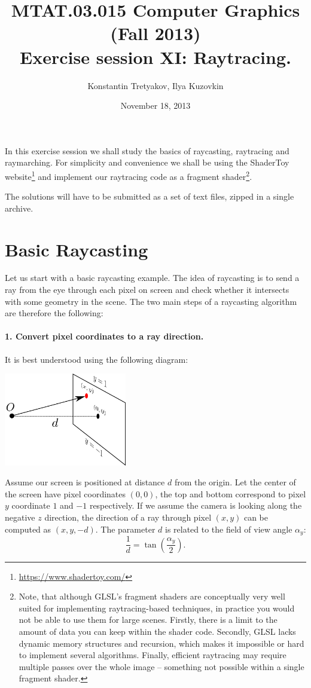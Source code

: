 \documentclass{article}
\begin{document}
\title{MTAT.03.015 Computer Graphics (Fall 2013)\\
Exercise session XI: Raytracing.}
\author{Konstantin Tretyakov, Ilya Kuzovkin}
\date{November 18, 2013}
\maketitle

In this exercise session we shall study the basics of raycasting, raytracing and raymarching. For simplicity and convenience we shall be using the ShaderToy website\footnote{\url{https://www.shadertoy.com/}} and implement our raytracing code as a fragment shader\footnote{Note, that although GLSL's fragment shaders are conceptually very well suited for implementing raytracing-based techniques, in practice you would not be able to use them for large scenes. Firstly, there is a limit to the amount of data you can keep within the shader code. Secondly, GLSL lacks dynamic memory structures and recursion, which makes it impossible or hard to implement several algorithms. Finally, efficient raytracing may require multiple passes over the whole image -- something not possible within a single fragment shader.}.

The solutions will have to be submitted as a set of text files, zipped in a single archive.

\section{Basic Raycasting}
Let us start with a basic raycasting example. The idea of raycasting is to send a ray from the eye through each pixel on screen and check whether it intersects with some geometry in the scene. The two main steps of a raycasting algorithm are therefore the following:
\paragraph{1. Convert pixel coordinates to a ray direction.}
It is best understood using the following diagram:
\begin{center}
\includegraphics[width=0.4\textwidth]{fig1.png}
\end{center}
Assume our screen is positioned at distance $d$ from the origin. Let the center of the screen have pixel coordinates $(0, 0)$, the top and bottom correspond to pixel $y$ coordinate $1$ and $-1$ respectively. If we assume the camera is looking along the negative $z$ direction, the direction of a ray through pixel $(x,y)$ can be computed as $(x, y, -d)$. The parameter $d$ is related to the field of view angle $\alpha_y$:
$$\frac{1}{d} = \tan\left(\frac{\alpha_y}{2}\right).
$$
\end{document}
